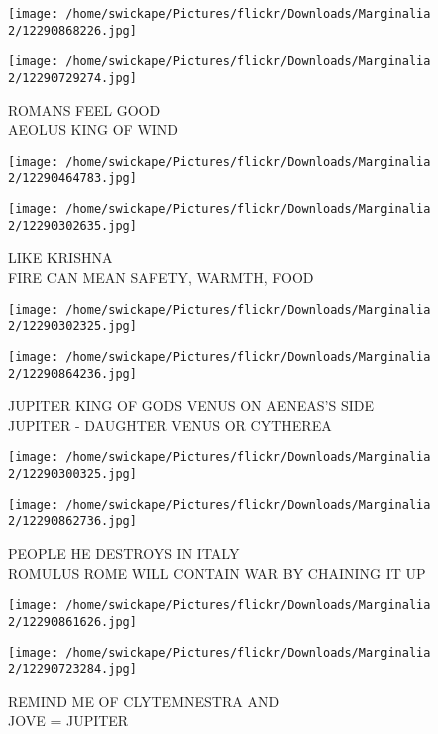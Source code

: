 \documentclass[10pt,letterpaper]{article}
\begin{document}
\texttt{[image: /home/swickape/Pictures/flickr/Downloads/Marginalia 2/12290868226.jpg]}

\vspace{0.25in}
\texttt{[image: /home/swickape/Pictures/flickr/Downloads/Marginalia 2/12290729274.jpg]}

ROMANS FEEL GOOD\\
AEOLUS KING OF WIND\\
\pagebreak

\texttt{[image: /home/swickape/Pictures/flickr/Downloads/Marginalia 2/12290464783.jpg]}

\vspace{0.25in}
\texttt{[image: /home/swickape/Pictures/flickr/Downloads/Marginalia 2/12290302635.jpg]}

LIKE KRISHNA\\
FIRE CAN MEAN SAFETY, WARMTH, FOOD\\
\pagebreak

\texttt{[image: /home/swickape/Pictures/flickr/Downloads/Marginalia 2/12290302325.jpg]}

\vspace{0.25in}
\texttt{[image: /home/swickape/Pictures/flickr/Downloads/Marginalia 2/12290864236.jpg]}

JUPITER KING OF GODS VENUS ON AENEAS'S SIDE\\
JUPITER {-} DAUGHTER VENUS OR CYTHEREA\\
\pagebreak

\texttt{[image: /home/swickape/Pictures/flickr/Downloads/Marginalia 2/12290300325.jpg]}

\vspace{0.25in}
\texttt{[image: /home/swickape/Pictures/flickr/Downloads/Marginalia 2/12290862736.jpg]}

PEOPLE HE DESTROYS IN ITALY\\
ROMULUS ROME WILL CONTAIN WAR BY CHAINING IT UP\\
\pagebreak

\texttt{[image: /home/swickape/Pictures/flickr/Downloads/Marginalia 2/12290861626.jpg]}

\vspace{0.25in}
\texttt{[image: /home/swickape/Pictures/flickr/Downloads/Marginalia 2/12290723284.jpg]}

REMIND ME OF CLYTEMNESTRA AND\\
JOVE = JUPITER\\
\pagebreak
\end{document}
